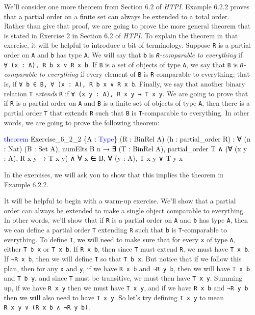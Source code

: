 \documentclass[
  letterpaper,
  DIV=11,
  numbers=noendperiod]{scrreprt}
\newenvironment{Shaded}{\begin{snugshade}}{\end{snugshade}}
\newcommand{\KeywordTok}[1]{\textcolor[rgb]{0.00,0.23,0.31}{#1}}
\newcommand{\NormalTok}[1]{\textcolor[rgb]{0.00,0.23,0.31}{#1}}
\renewcommand{\NormalTok}[1]{\textcolor[HTML]{000000}{#1}}
\renewcommand{\KeywordTok}[1]{\textcolor[HTML]{0000FF}{#1}}
\theoremstyle{remark}
\begin{document}
We'll consider one more theorem from Section 6.2 of \emph{HTPI}. Example
6.2.2 proves that a partial order on a finite set can always be extended
to a total order. Rather than give that proof, we are going to prove the
more general theorem that is stated in Exercise 2 in Section 6.2 of
\emph{HTPI}. To explain the theorem in that exercise, it will be helpful
to introduce a bit of terminology. Suppose \texttt{R} is a partial order
on \texttt{A} and \texttt{b} has type \texttt{A}. We will say that
\texttt{b} is \emph{\texttt{R}-comparable to everything} if
\texttt{∀\ (x\ :\ A),\ R\ b\ x\ ∨\ R\ x\ b}. If \texttt{B} is a set of
objects of type \texttt{A}, we say that \texttt{B} is
\emph{\texttt{R}-comparable to everything} if every element of
\texttt{B} is \texttt{R}-comparable to everything; that is, if
\texttt{∀\ b\ ∈\ B,\ ∀\ (x\ :\ A),\ R\ b\ x\ ∨\ R\ x\ b}. Finally, we
say that another binary relation \texttt{T} \emph{extends} \texttt{R} if
\texttt{∀\ (x\ y\ :\ A),\ R\ x\ y\ →\ T\ x\ y}. We are going to prove
that if \texttt{R} is a partial order on \texttt{A} and \texttt{B} is a
finite set of objects of type \texttt{A}, then there is a partial order
\texttt{T} that extends \texttt{R} such that \texttt{B} is
\texttt{T}-comparable to everything. In other words, we are going to
prove the following theorem:

\begin{Shaded}
\begin{Highlighting}[]
\KeywordTok{theorem}\NormalTok{ Exercise\_6\_2\_2 \{A : }\KeywordTok{Type}\NormalTok{\} (R : BinRel A) (h : partial\_order R) :}
\NormalTok{    ∀ (n : Nat) (B : Set A), numElts B n → ∃ (T : BinRel A),}
\NormalTok{    partial\_order T ∧ (∀ (x y : A), R x y → T x y) ∧}
\NormalTok{    ∀ x ∈ B, ∀ (y : A), T x y ∨ T y x}
\end{Highlighting}
\end{Shaded}

In the exercises, we will ask you to show that this implies the theorem
in Example 6.2.2.

It will be helpful to begin with a warm-up exercise. We'll show that a
partial order can always be extended to make a single object comparable
to everything. In other words, we'll show that if \texttt{R} is a
partial order on \texttt{A} and \texttt{b} has type \texttt{A}, then we
can define a partial order \texttt{T} extending \texttt{R} such that
\texttt{b} is \texttt{T}-comparable to everything. To define \texttt{T},
we will need to make sure that for every \texttt{x} of type \texttt{A},
either \texttt{T\ b\ x} or \texttt{T\ x\ b}. If \texttt{R\ x\ b}, then
since \texttt{T} must extend \texttt{R}, we must have \texttt{T\ x\ b}.
If \texttt{¬R\ x\ b}, then we will define \texttt{T} so that
\texttt{T\ b\ x}. But notice that if we follow this plan, then for any
\texttt{x} and \texttt{y}, if we have \texttt{R\ x\ b} and
\texttt{¬R\ y\ b}, then we will have \texttt{T\ x\ b} and
\texttt{T\ b\ y}, and since \texttt{T} must be transitive, we must then
have \texttt{T\ x\ y}. Summing up, if we have \texttt{R\ x\ y} then we
must have \texttt{T\ x\ y}, and if we have \texttt{R\ x\ b} and
\texttt{¬R\ y\ b} then we will also need to have \texttt{T\ x\ y}. So
let's try defining \texttt{T\ x\ y} to mean
\texttt{R\ x\ y\ ∨\ (R\ x\ b\ ∧\ ¬R\ y\ b)}.
\end{document}
